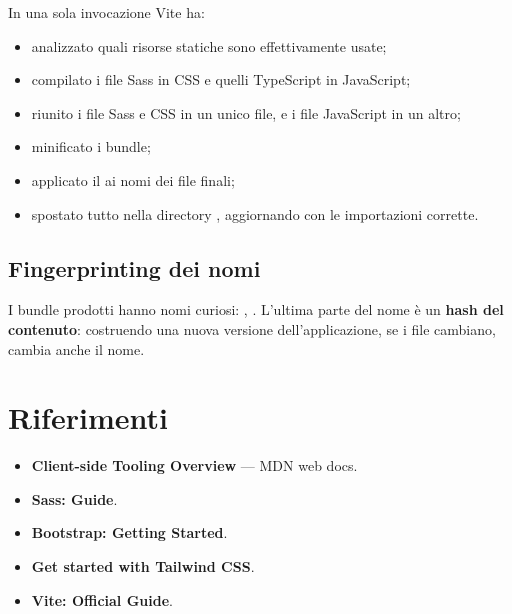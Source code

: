 In una sola invocazione Vite ha:

\begin{itemize}
  \item analizzato quali risorse statiche sono effettivamente usate;
  \item compilato i file Sass in CSS e quelli TypeScript in JavaScript;
  \item riunito i file Sass e CSS in un unico file, e i file JavaScript in un
        altro;
  \item minificato i bundle;
  \item applicato il  ai nomi dei file finali;
  \item spostato tutto nella directory , aggiornando
         con le importazioni corrette.
\end{itemize}

\subsection{Fingerprinting dei nomi}

I bundle prodotti hanno nomi curiosi: ,
. L'ultima parte del nome è un \textbf{hash del
contenuto}: costruendo una nuova versione dell'applicazione, se i file cambiano,
cambia anche il nome.


\section{Riferimenti}

\begin{itemize}
  \item \textbf{Client-side Tooling Overview} --- MDN web docs. \\
  \item \textbf{Sass: Guide}. \\
  \item \textbf{Bootstrap: Getting Started}. \\
  \item \textbf{Get started with Tailwind CSS}. \\
  \item \textbf{Vite: Official Guide}. \\
\end{itemize}
